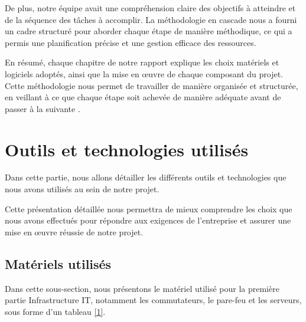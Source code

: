 De plus, notre équipe avait une compréhension claire des objectifs à atteindre et de la séquence des tâches à accomplir. La méthodologie en cascade nous a fourni un cadre structuré pour aborder chaque étape de manière méthodique, ce qui a permis une planification précise et une gestion efficace des ressources.



En résumé, chaque chapitre de notre rapport explique les choix matériels et logiciels adoptés, ainsi que la mise en œuvre de chaque composant du projet. Cette méthodologie nous permet de travailler de manière organisée et structurée, en veillant à ce que chaque étape soit achevée de manière adéquate avant de passer à la suivante \cite{fagarasan2021agile}.



\section{Outils et technologies utilisés}

Dans cette partie, nous allons détailler les différents outils et technologies que nous avons utilisés au sein de notre projet.

Cette présentation détaillée nous permettra de mieux comprendre les choix que nous avons effectués pour répondre aux exigences de l'entreprise et assurer une mise en œuvre réussie de notre projet.

\subsection{Matériels utilisés}

Dans cette sous-section, nous présentons le matériel utilisé pour la première partie Infrastructure IT, notamment les commutateurs, le pare-feu et les serveurs, sous forme d'un tableau \ref{1}.


